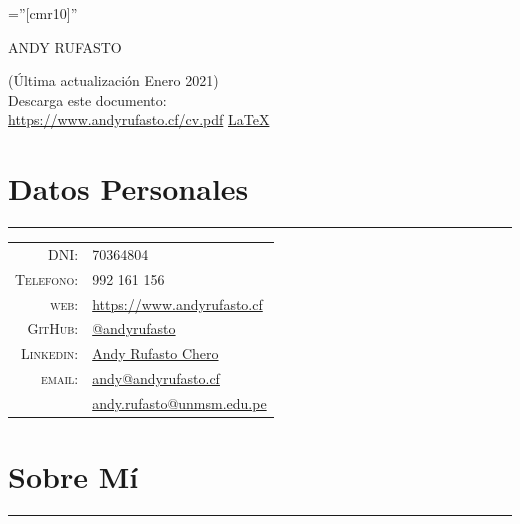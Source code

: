 \documentclass[a4paper,10pt]{article}
\begin{document}
\pagestyle{empty} %

\font\fb=''[cmr10]'' %

\par{\centering
		{\Huge ANDY RUFASTO\\ \bigskip\par} }


\hfill\begin{minipage}{0.5\linewidth}
	(Última actualización Enero 2021)\\ 
	Descarga este documento:\\
 	\href{https://www.andyrufasto.cf/cv.pdf}{https://www.andyrufasto.cf/cv.pdf}
	\href{https://www.github.com/andyrufasto/cv}{\LaTeX}
\end{minipage}

\section{Datos Personales}
	\hrule
	\begin{tabular}{rl}
    \textsc{DNI:}       & 70364804\\
    \textsc{Telefono:}  & 992 161 156\\
    \textsc{web:}       & \href{https://www.andyrufasto.cf}{https://www.andyrufasto.cf}\\
    \textsc{GitHub:}    & \href{https://www.github.com/andyrufasto}{@andyrufasto}\\
    \textsc{Linkedin:}  & \href{https://www.linkedin.com/in/andyrufasto/}{Andy Rufasto Chero}\\
    \textsc{email:}     & \href{mailto:andy@andyrufasto.cf}{andy@andyrufasto.cf}\\
				                & \href{mailto:andy.rufasto@unmsm.edu.pe}{andy.rufasto@unmsm.edu.pe}\\
	\end{tabular}

\section{Sobre Mí}
	\hrule
\end{document}
